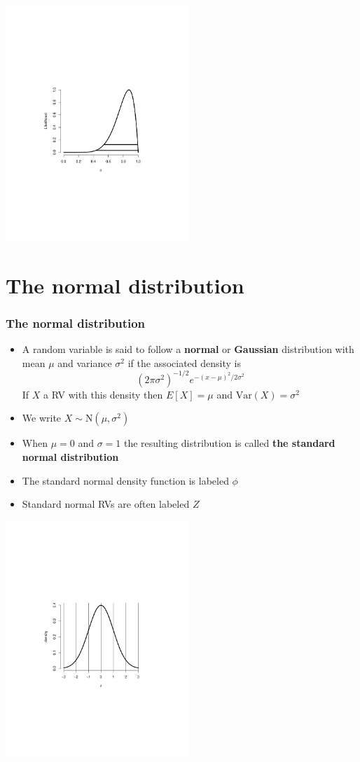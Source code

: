 \documentclass[aspectratio=169]{beamer}
\newcommand{\Var}{\mathrm{Var}}
\begin{document}
\begin{frame}
  \includegraphics[height=3.5in]{birthLikelihood.pdf}
\end{frame}

\section{The normal distribution}
\begin{frame}\frametitle{The normal distribution}
\begin{itemize}
\item A random variable is said to follow a {\bf normal} or {\bf
    Gaussian} distribution with mean $\mu$ and variance $\sigma^2$ if
  the associated density is
  $$
  (2\pi \sigma^2)^{-1/2}e^{-(x - \mu)^2/2\sigma^2}
  $$
  If $X$ a RV with this density then $E[X] = \mu$ and $\Var(X) = \sigma^2$
\item We write $X\sim \mbox{N}(\mu, \sigma^2)$
\item When $\mu = 0$ and $\sigma = 1$ the resulting distribution is
  called {\bf the standard normal distribution}
\item The standard normal density function is labeled $\phi$
\item Standard normal RVs are often labeled $Z$
\end{itemize}
\end{frame}

\begin{frame}
\includegraphics[height=3.5in]{stdNormal.pdf}
\end{frame}
\end{document}
